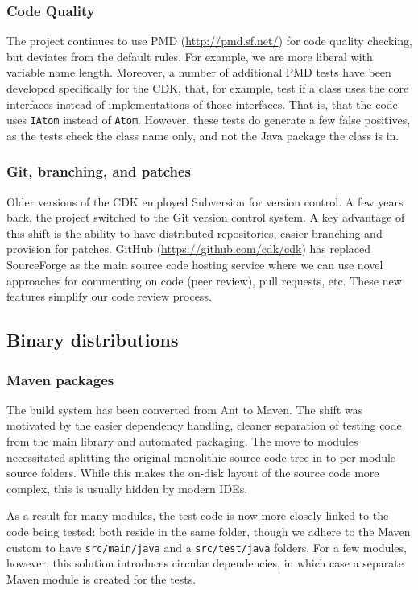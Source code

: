 \documentclass[10pt]{bmcart}
\begin{document}
\subsubsection*{Code Quality}

The project continues to use PMD (\url{http://pmd.sf.net/}) for code quality checking,
but deviates from the default rules. For example, we are more liberal with 
variable name length. Moreover, a number of additional PMD tests have been
developed specifically for the CDK, that, for example, test if a class uses
the core interfaces instead of implementations of those interfaces. That is,
that the code uses \texttt{IAtom} instead of \texttt{Atom}. However, these tests do generate a
few false positives, as the tests check the class name only, and not the
Java package the class is in.

\subsubsection*{Git, branching, and patches}

Older versions of the CDK employed Subversion for version control. A
few years back, the project switched to the Git version control
system. A key advantage of this shift is the ability to have
distributed repositories, easier branching and provision for
patches. GitHub (\url{https://github.com/cdk/cdk}) has replaced
SourceForge as the main source code hosting service where we can use
novel approaches for commenting on code (peer review), pull requests,
etc. These new features simplify our code review process.

\subsection*{Binary distributions}

\subsubsection*{Maven packages}

The build system has been converted from Ant to Maven. The shift was
motivated by the easier dependency handling, cleaner separation of
testing code from the main library and automated packaging. The move
to modules necessitated splitting the original monolithic source code
tree in to per-module source folders. While this makes the on-disk
layout of the source code more complex, this is usually hidden by
modern IDEs.

As a result for many modules, the test code is now more closely linked
to the code being tested: both reside in the same folder, though we
adhere to the Maven custom to have \texttt{src/main/java} and a
\texttt{src/test/java} folders.  For a few modules, however, this
solution introduces circular dependencies, in which case a separate
Maven module is created for the tests.
\end{document}
